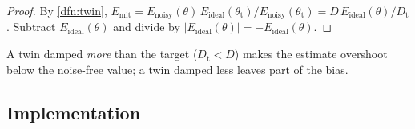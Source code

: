 \begin{proof}
  By \cref{dfn:twin},
  $E_{\mathrm{mit}}=E_{\mathrm{noisy}}(\theta)\,E_{\mathrm{ideal}}(\theta_{\mathrm t})/E_{\mathrm{noisy}}(\theta_{\mathrm t})
  =D\,E_{\mathrm{ideal}}(\theta)/D_{\mathrm t}$. Subtract $E_{\mathrm{ideal}}(\theta)$ and divide
  by $|E_{\mathrm{ideal}}(\theta)|=-E_{\mathrm{ideal}}(\theta)$.
\end{proof}

A twin damped \emph{more} than the target ($D_{\mathrm t}<D$) makes the estimate overshoot
below the noise-free value; a twin damped less leaves part of the bias.

\subsection{Implementation}


